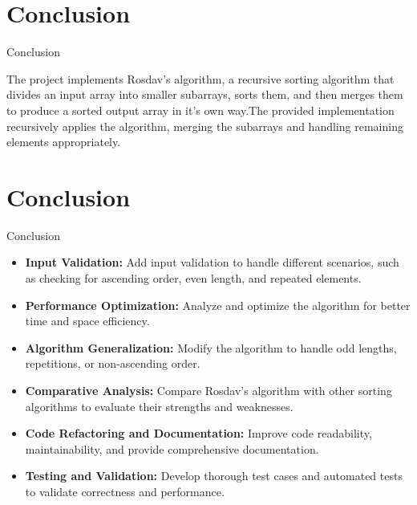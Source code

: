 \documentclass[10pt]{beamer}
\begin{document}
\section{Conclusion}
\begin{frame}[fragile]{Conclusion}
\begin{tcolorbox}[colback=blue!5,colframe=blue!40!black,]
\Large The project implements Rosdav's algorithm, a recursive sorting algorithm that divides an input array into smaller subarrays, sorts them, and then merges them to produce a sorted output array in it's own way.The provided implementation recursively applies the algorithm, merging the subarrays and handling remaining elements appropriately.
\end{tcolorbox}
\end{frame}

\section{Conclusion}
\begin{frame}{Conclusion}
\begin{tcolorbox}[colback=blue!5,colframe=blue!40!black,title=Possible work or Improvements]
\begin{itemize}
\item \textbf{Input Validation:} Add input validation to handle different scenarios, such as checking for ascending order, even length, and repeated elements.

\item \textbf{Performance Optimization:}  Analyze and optimize the algorithm for better time and space efficiency.

\item \textbf{Algorithm Generalization:}  Modify the algorithm to handle odd lengths, repetitions, or non-ascending order.

\item \textbf{Comparative Analysis:}  Compare Rosdav's algorithm with other sorting algorithms to evaluate their strengths and weaknesses.

\item \textbf{Code Refactoring and Documentation:}  Improve code readability, maintainability, and provide comprehensive documentation.

\item \textbf{Testing and Validation:}  Develop thorough test cases and automated tests to validate correctness and performance.

\end{itemize}
\end{tcolorbox}
\end{frame}
\end{document}
